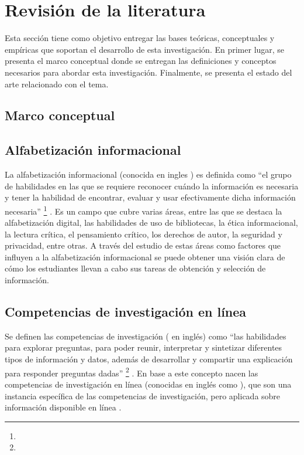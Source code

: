 \section{Revisión de la literatura}
\label{sec:revision-literatura}
Esta sección tiene como objetivo entregar las bases teóricas, conceptuales y empíricas que soportan el desarrollo de esta investigación. En primer lugar, se presenta el marco conceptual donde se entregan las definiciones y conceptos necesarios para abordar esta investigación. Finalmente, se presenta el estado del arte relacionado con el tema.

\subsection{Marco conceptual}

\subsection*{Alfabetización informacional}
La alfabetización informacional (conocida en ingles ) es definida como “el grupo de habilidades en las que se requiere reconocer cuándo la información es necesaria y tener la habilidad de encontrar, evaluar y usar efectivamente dicha información necesaria” \footnote{\traduccionlibre} \parencite[p.~2]{american2000information}. Es un campo que cubre varias áreas, entre las que se destaca la alfabetización digital, las habilidades de uso de bibliotecas, la ética informacional, la lectura crítica, el pensamiento crítico, los derechos de autor, la seguridad y privacidad, entre otras. A través del estudio de estas áreas como factores que influyen a la alfabetización informacional se puede obtener una visión clara de cómo los estudiantes llevan a cabo sus tareas de obtención y selección de información.

\subsection*{Competencias de investigación en línea}
Se definen las competencias de investigación ( en inglés) como “las habilidades para explorar preguntas, para poder reunir, interpretar y sintetizar diferentes tipos de información y datos, además de desarrollar y compartir una explicación para responder preguntas dadas” \footnote{\traduccionlibre} \parencite[p.~13]{national2000inquiry}. En base a este concepto nacen las competencias de investigación en línea (conocidas en inglés como ), que son una instancia específica de las competencias de investigación, pero aplicada sobre información disponible en línea \parencite{quintana2005framework}.

